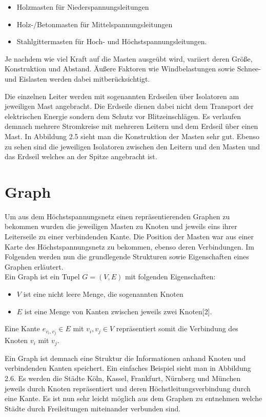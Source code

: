 \begin{itemize}
	\item Holzmasten für Niederspannungsleitungen 
	\item Holz-/Betonmasten für Mittelspannungsleitungen
	\item Stahlgittermasten für Hoch- und Höchstspannungsleitungen.
\end{itemize} 

Je nachdem wie viel Kraft auf die Masten ausgeübt wird, variiert deren Größe, Konstruktion und Abstand. Äußere Faktoren wie Windbelastungen sowie Schnee- und Eislasten werden dabei mitberücksichtigt.

Die einzelnen Leiter werden mit sogenannten Erdseilen über Isolatoren am jeweiligen Mast angebracht. Die Erdseile dienen dabei nicht dem Transport der elektrischen Energie sondern dem Schutz vor Blitzeinschlägen. Es verlaufen demnach mehrere Stromkreise mit mehreren Leitern und dem Erdseil über einen Mast. In Abbildung 2.5 sieht man die Konstruktion der Masten sehr gut. Ebenso zu sehen sind die jeweiligen Isolatoren zwischen den Leitern und den Masten und das Erdseil welches an der Spitze angebracht ist.

\section{Graph}
\label{Graph}
%

Um aus dem Höchstspannungsnetz einen repräsentierenden Graphen zu bekommen wurden die jeweiligen Masten zu Knoten und jeweils eins ihrer Leiterseile zu einer verbindenden Kante. Die Position der Masten war aus einer Karte des Höchstspannungsnetz zu bekommen, ebenso deren Verbindungen. Im Folgenden werden nun die grundlegende Strukturen sowie Eigenschaften eines Graphen erläutert. \\

Ein Graph ist ein Tupel $G = (V,E)$ mit folgenden Eigenschaften:

\begin{itemize}
	\item $V$ ist eine nicht leere Menge, die sogenannten Knoten
	\item $E$ ist eine Menge von Kanten zwischen jeweils zwei Knoten[2].
\end{itemize} 

Eine Kante $e_{v_{i},v_{j}} \in E$ mit $v_{i},v_{j} \in V$ repräsentiert somit die Verbindung des Knoten $v_{i}$ mit $v_{j}$.

Ein Graph ist demnach eine Struktur die Informationen anhand Knoten und verbindenden Kanten speichert. Ein einfaches Beispiel sieht man in Abbildung 2.6. Es werden die Städte Köln, Kassel, Frankfurt, Nürnberg und München jeweils durch Knoten repräsentiert und deren Höchstleitungsverbindung durch eine Kante. Es ist nun sehr leicht möglich aus dem Graphen zu entnehmen welche Städte durch Freileitungen miteinander verbunden sind.\\

